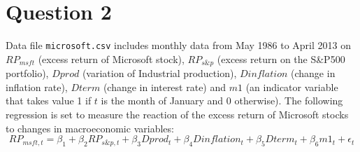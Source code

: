 \documentclass[12pt,a4paper]{article}
\begin{document}
\newpage

\section*{Question 2}
Data file \texttt{microsoft.csv} includes monthly data from May 1986 to April 2013 on $RP_{msft}$ (excess return of Microsoft stock), $RP_{s\&p}$ (excess return on the S\&P500 portfolio), $Dprod$ (variation of Industrial production), $Dinflation$ (change in inflation rate), $Dterm$ (change in interest rate) and $m1$ (an indicator variable that takes value 1 if $t$ is the month of January and 0 otherwise). The following regression is set to measure the reaction of the excess return of Microsoft stocks to changes in macroeconomic variables:
\[
RP_{msft,t} = \beta_1 + \beta_2 RP_{s\&p,t} + \beta_3 Dprod_t + \beta_4 Dinflation_t + \beta_5 Dterm_t + \beta_6 m1_t + \epsilon_t
\]
\end{document}
